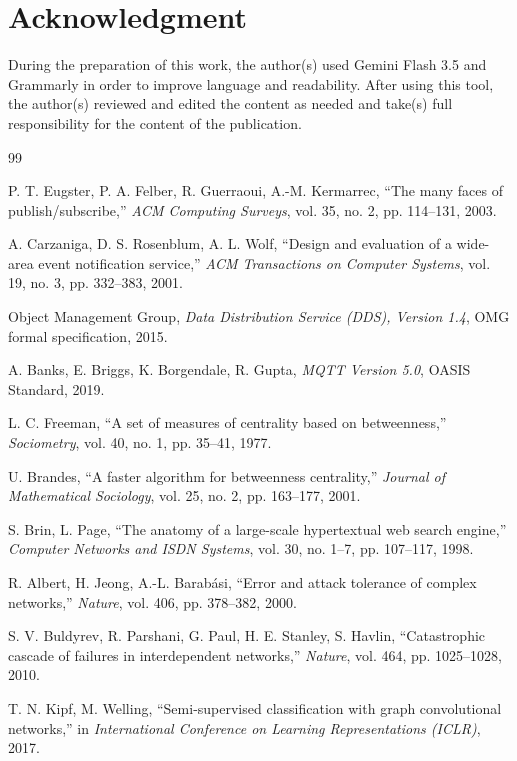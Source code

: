 \documentclass[review]{elsarticle}
\begin{document}
\section*{Acknowledgment}

During the preparation of this work, the author(s) used Gemini Flash 3.5 and Grammarly in order to
improve language and readability. After using this tool, the author(s) reviewed and edited the
content as needed and take(s) full responsibility for the content of the publication.

\begin{thebibliography}{99}

 P. T. Eugster, P. A. Felber, R. Guerraoui, A.-M. Kermarrec, ``The many faces
of publish/subscribe,'' \emph{ACM Computing Surveys}, vol. 35, no. 2, pp. 114--131, 2003.

 A. Carzaniga, D. S. Rosenblum, A. L. Wolf, ``Design and evaluation of a
wide-area event notification service,'' \emph{ACM Transactions on Computer Systems}, vol. 19,
no. 3, pp. 332--383, 2001.

 Object Management Group, \emph{Data Distribution Service (DDS), Version 1.4},
OMG formal specification, 2015.

 A. Banks, E. Briggs, K. Borgendale, R. Gupta, \emph{MQTT Version 5.0},
OASIS Standard, 2019.

 L. C. Freeman, ``A set of measures of centrality based on betweenness,''
\emph{Sociometry}, vol. 40, no. 1, pp. 35--41, 1977.

 U. Brandes, ``A faster algorithm for betweenness centrality,'' \emph{Journal
of Mathematical Sociology}, vol. 25, no. 2, pp. 163--177, 2001.

 S. Brin, L. Page, ``The anatomy of a large-scale hypertextual web search
engine,'' \emph{Computer Networks and ISDN Systems}, vol. 30, no. 1--7, pp. 107--117, 1998.

 R. Albert, H. Jeong, A.-L. Barab\'{a}si, ``Error and attack tolerance of
complex networks,'' \emph{Nature}, vol. 406, pp. 378--382, 2000.

 S. V. Buldyrev, R. Parshani, G. Paul, H. E. Stanley, S. Havlin,
``Catastrophic cascade of failures in interdependent networks,'' \emph{Nature}, vol. 464,
pp. 1025--1028, 2010.

 T. N. Kipf, M. Welling, ``Semi-supervised classification with graph
convolutional networks,'' in \emph{International Conference on Learning Representations (ICLR)},
2017.


\end{thebibliography}
\end{document}
